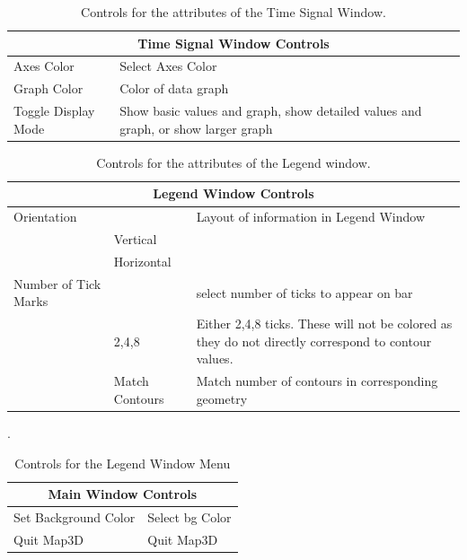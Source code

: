 \begin{table}[ht]
\caption{Controls for the attributes of the Time Signal Window.}
  \begin{center}
    \begin{tabular}{|l|p{4in}|} \hline
      \multicolumn{2}{|c|}{\textbf{Time Signal Window Controls}}
      \\ \hline \hline
      Axes Color & Select Axes Color \\
      Graph Color & Color of data graph \\  
      Toggle Display Mode & Show basic values and graph, show
      detailed values and graph, or show larger
      graph\\ \hline
    \end{tabular}
  \end{center}
\end{table}


\begin{table}[ht]
\caption{Controls for the attributes of the Legend window.}
  \begin{center}
    \begin{tabular}{|l|l|p{3 in}|} \hline
      \multicolumn{3}{|c|}{\textbf{Legend Window Controls}} \\ \hline
    Orientation & & Layout of information in Legend Window\\
      & Vertical & \\
      & Horizontal & \\ \hline
    Number of Tick Marks & & select number of ticks to appear on bar \\
      & 2,4,8 & Either 2,4,8 ticks.  These will not be colored as they do not
        directly correspond to contour values. \\
      & Match Contours & Match number of contours in corresponding geometry
    \\ \hline 
    \end{tabular}
  \end{center}
\end{table}

\begin{table}[ht]
\caption{Controls for the Legend Window Menu}.
  \begin{center}
    \begin{tabular}{|l|p{4in}|} \hline
      \multicolumn{2}{|c|}{\textbf{Main Window Controls}} \\ \hline \hline
      Set Background Color & Select bg Color \\
      Quit Map3D & Quit Map3D \\ \hline
    \end{tabular}
  \end{center}
\end{table}

